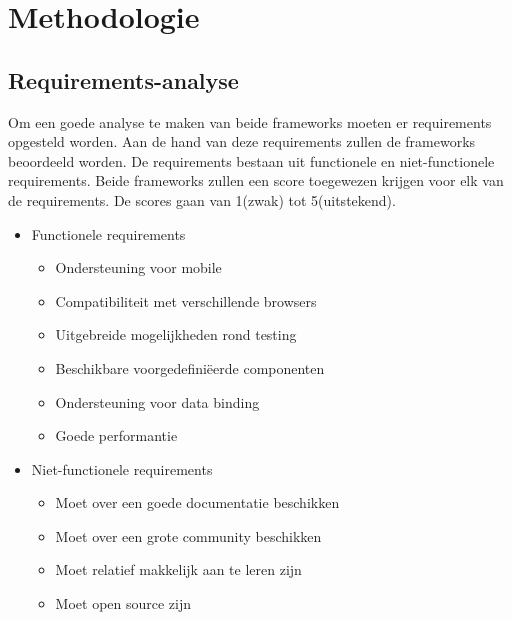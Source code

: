 
\chapter{Methodologie}
\label{ch:methodologie}


\section{Requirements-analyse}
Om een goede analyse te maken van beide frameworks moeten er requirements opgesteld worden. Aan de hand van deze requirements zullen de frameworks beoordeeld worden. De requirements bestaan uit functionele en niet-functionele requirements. Beide frameworks zullen een score toegewezen krijgen voor elk van de requirements. De scores gaan van 1(zwak) tot 5(uitstekend).

\begin{itemize}
\item  Functionele requirements 
\begin{itemize}
	\item Ondersteuning voor mobile
	\item Compatibiliteit met verschillende browsers
	\item Uitgebreide mogelijkheden rond testing
	\item Beschikbare voorgedefiniëerde componenten 
	\item Ondersteuning voor data binding
	\item Goede performantie
\end{itemize}

\item Niet-functionele requirements
\begin{itemize}
	\item Moet over een goede documentatie beschikken
	\item Moet over een grote community beschikken
	\item Moet relatief makkelijk aan te leren zijn 
	\item Moet open source zijn	
\end{itemize}
\end{itemize}

